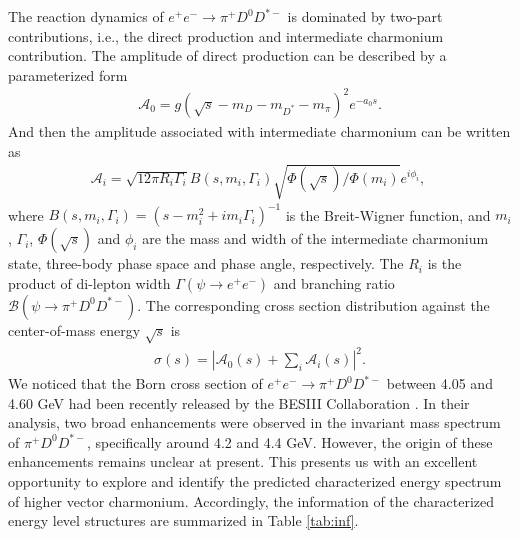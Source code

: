 \documentclass[prl,twocolumn,floatfix,amsmath,nofootinbib,amssymb,floatfix]{revtex4}
\begin{document}
The reaction dynamics of $e^+e^-\to \pi^+ D^0 D^{*-}$ is dominated by two-part contributions, i.e., the direct production and intermediate charmonium contribution. The amplitude of direct production can be described by a parameterized form 
\begin{eqnarray}
    \mathcal{A}_{0}=g\left(\sqrt{s}-m_D-m_{D^*}-m_{\pi}\right)^2e^{-a_0s}. \label{eq1}
\end{eqnarray}
And then the amplitude associated with intermediate charmonium can be written as  
\begin{eqnarray}
\mathcal{A}_{i}=\sqrt{12\pi R_i\Gamma_i}B(s,m_i,\Gamma_i)\sqrt{\Phi(\sqrt{s})/\Phi(m_i)}e^{i\phi_i},~ \label{eq:1}
\end{eqnarray}
where $B(s,m_i,\Gamma_i)=(s-m_i^2+im_i\Gamma_i)^{-1}$ is the Breit-Wigner function, and $m_i$, $\Gamma_i$, $\Phi(\sqrt{s})$ and $\phi_i$ are the mass and width of the intermediate charmonium state, three-body phase space and phase angle, respectively. The $R_i$ is the product of di-lepton width $\Gamma(\psi\to e^+e^-)$ and branching ratio $\mathcal{B}(\psi\to\pi^+ D^0 D^{*-})$. The corresponding cross section distribution against the center-of-mass energy $\sqrt{s}$ is 
\begin{eqnarray}   \sigma(s)=\left|\mathcal{A}_{0}(s)+\sum_i\mathcal{A}_{i}(s)\right|^2. \label{eq2}
\end{eqnarray}
We noticed that the Born cross section of $e^+e^- \to\pi^+ D^0 D^{*-}$ between 4.05 and 4.60 GeV had been recently released by the BESIII Collaboration \cite{BESIII:2018iea}. In their analysis,  two broad enhancements were observed in the invariant mass spectrum of $\pi^+ D^0 D^{*-}$,  specifically around 4.2 and 4.4 GeV. However, the origin of these enhancements remains unclear at present. This presents us with an excellent opportunity to explore and identify the predicted characterized energy spectrum of higher vector charmonium. Accordingly, the information of the characterized energy level structures are summarized in Table \ref{tab:inf}.  
\end{document}
